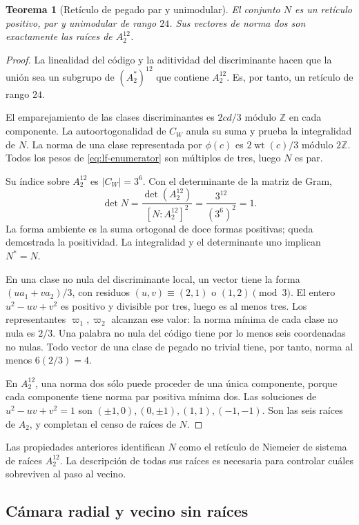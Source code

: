 \documentclass[a4paper,10pt]{article}
\newtheorem{theorem}{Teorema}[section]
\theoremstyle{definition}\newtheorem{definition}[theorem]{Definición}
\theoremstyle{remark}\newtheorem{remark}[theorem]{Observación}
\numberwithin{equation}{section}
\begin{document}
\begin{theorem}[Retículo de pegado par y unimodular]
\label{thm:lf-niemeier}
El conjunto \(N\) es un retículo positivo, par y
unimodular de rango \(24\). Sus vectores de norma dos
son exactamente las raíces de \(A_2^{12}\).
\end{theorem}
\begin{proof}
La linealidad del código y la aditividad del discriminante
hacen que la unión sea un subgrupo de
\((A_2^*)^{12}\) que contiene \(A_2^{12}\).
Es, por tanto, un retículo de rango \(24\).

El emparejamiento de las clases discriminantes es
\(2cd/3\) módulo \(\mathbb Z\) en cada componente.
La autoortogonalidad de \(C_W\) anula su suma y prueba
la integralidad de \(N\). La norma de una clase
representada por \(\phi(c)\) es
\(2\operatorname{wt}(c)/3\) módulo \(2\mathbb Z\).
Todos los pesos de \eqref{eq:lf-enumerator} son
múltiplos de tres, luego \(N\) es par.

Su índice sobre \(A_2^{12}\) es \(|C_W|=3^6\).
Con el determinante de la matriz de Gram,
\[
 \det N=\frac{\det(A_2^{12})}{[N:A_2^{12}]^2}
       =\frac{3^{12}}{(3^6)^2}=1.
\]
La forma ambiente es la suma ortogonal de doce formas
positivas; queda demostrada la positividad.
La integralidad y el determinante uno implican
\(N^*=N\).

En una clase no nula del discriminante local, un
vector tiene la forma \((ua_1+va_2)/3\), con residuos
\((u,v)\equiv(2,1)\) o \((1,2)\pmod3\).
El entero \(u^2-uv+v^2\) es positivo y divisible
por tres, luego es al menos tres. Los representantes
\(\varpi_1,\varpi_2\) alcanzan ese valor: la norma
mínima de cada clase no nula es \(2/3\).
Una palabra no nula del código tiene por lo menos
seis coordenadas no nulas. Todo vector de una clase
de pegado no trivial tiene, por tanto, norma
al menos \(6(2/3)=4\).

En \(A_2^{12}\), una norma dos sólo puede proceder
de una única componente, porque cada componente
tiene norma par positiva mínima dos. Las soluciones
de \(u^2-uv+v^2=1\) son
\((\pm1,0),(0,\pm1),(1,1),(-1,-1)\).
Son las seis raíces de \(A_2\), y completan el censo
de raíces de \(N\).
\end{proof}

Las propiedades anteriores identifican \(N\) como el
retículo de Niemeier de sistema de raíces \(A_2^{12}\).
La descripción de todas sus raíces es necesaria para
controlar cuáles sobreviven al paso al vecino.

\subsection{Cámara radial y vecino sin raíces}
\label{subsec:lf-neighbour}
\end{document}
